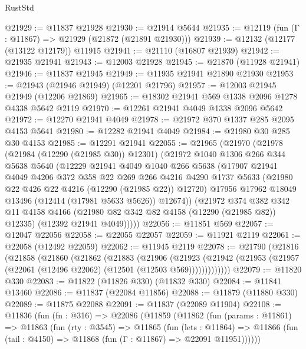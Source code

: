 \begin{lexlean}{RustStd}
\begin{coremodule}
{\begin{coremodule}
{{{{{{{{{{{{{{{{{{{{{{{{{{{{{{{{{{{{{{{{{{{{{{{{{{@21929 := @11837 @21928
@21930 := @21914 @5644
@21935 := @12119 (fun (Γ : @11867) => @21929 (@21872 (@21891 @21930)))
@21939 := @12132 (@12177 (@13122 @12179)) @11915
@21941 := @21110 (@16807 @21939)
@21942 := @21935 @21941
@21943 := @12003 @21928
@21945 := @21870 (@11928 @21941)
@21946 := @11837 @21945
@21949 := @11935 @21941 @21890 @21930
@21953 := @21943 (@21946 @21949) (@12201 @21796)
@21957 := @12003 @21945 @21949 (@12206 @21869)
@21965 := @18302 @21941 @569 @1338 @2096 @1278 @4338 @5642 @2119
@21970 := @12261 @21941 @4049 @1338 @2096 @5642
@21972 := @12270 @21941 @4049
@21978 := @21972 @370 @1337 @285 @2095 @4153 @5641
@21980 := @12282 @21941 @4049
@21984 := @21980 @30 @285 @30 @4153
@21985 := @12291 @21941
@22055 := @21965
    (@21970
      (@21978
        (@21984 (@12290 (@21985 @30)) @12301)
        (@21972
          @1040
          @1306
          @266
          @344
          @5638
          @5640
          (@12229
            @21941
            @4049
            @1040
            @266
            @5638
            (@17907
              @21941
              @4049
              @4206
              @372
              @358
              @22
              @269
              @266
              @4216
              @4290
              @1737
              @5633
              (@21980 @22 @426 @22 @4216 (@12290 (@21985 @22)) @12720)
              @17956
              @17962
              @18049
              @13496
              (@12414 (@17981 @5633 @5626))
              @12674))
          (@21972
            @374
            @382
            @342
            @11
            @4158
            @4166
            (@21980 @82 @342 @82 @4158 (@12290 (@21985 @82)) @12335)
            (@12392 @21941 @4049)))))
@22056 := @11851 @569
@22057 := @12047 @22056
@22058 := @22055 @22057
@22059 := @11921 @2119
@22061 := @22058 (@12492 @22059)
@22062 := @11945 @2119
@22078 := @21790
    (@21816
      (@21858
        (@21860
          (@21862
            (@21883
              (@21906
                (@21923
                  (@21942 (@21953 (@21957 (@22061 (@12496 @22062) (@12501 (@12503 @569)))))))))))))
@22079 := @11820 @330
@22083 := @11822 (@11826 @330) (@11832 @330)
@22084 := @11841 @13460
@22086 := @11837 (@22084 @11856)
@22088 := @11879 (@11880 @330)
@22089 := @11875 @22088
@22091 := @11837 (@22089 @11904)
@22108 := @11836
    (fun (fn : @316) =>
    @22086
      (@11859
        (@11862
          (fun (params : @11861) =>
          @11863
            (fun (rty : @3545) =>
            @11865
              (fun (lets : @11864) =>
              @11866 (fun (tail : @4150) => @11868 (fun (Γ : @11867) => @22091 @11951))))))
}}}}}}}}}}}}}}}}}}}}}}}}}}}}}}}}}}}}}}}}}}}}}}}}}}
\end{coremodule}}
\end{coremodule}
\end{lexlean}
